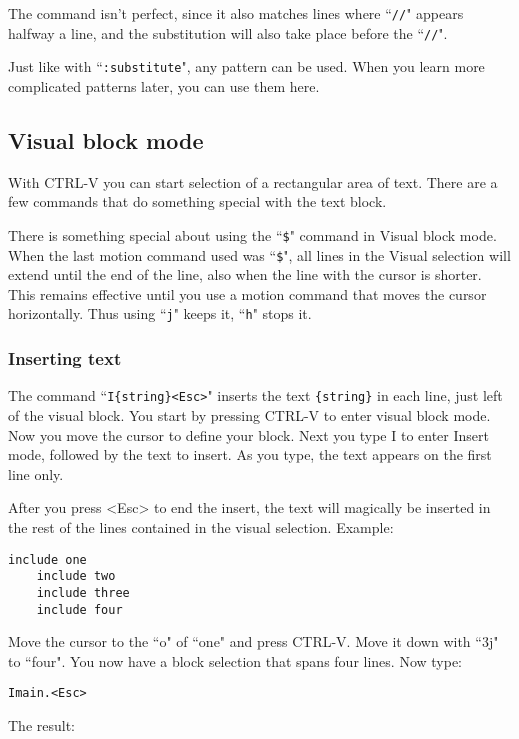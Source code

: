 The command isn't perfect, since it also matches lines where ``\texttt{//}" appears halfway a line, and the substitution will also take place before the ``\texttt{//}".

Just like with ``\texttt{:substitute}", any pattern can be used.
When you learn more complicated patterns later, you can use them here.
\subsection{Visual block mode}
With CTRL-V you can start selection of a rectangular area of text.
There are a few commands that do something special with the text block.

There is something special about using the ``\texttt{\$}" command in Visual block mode.
When the last motion command used was ``\texttt{\$}", all lines in the Visual selection will extend until the end of the line, also when the line with the cursor is shorter.
This remains effective until you use a motion command that moves the cursor horizontally.
Thus using ``\texttt{j}" keeps it, ``\texttt{h}" stops it.

\subsubsection{Inserting text}
The command  ``\texttt{I\{string\}<Esc>}" inserts the text \texttt{\{string\}} in each line, just left of the visual block.
You start by pressing CTRL-V to enter visual block mode.
Now you move the cursor to define your block.
Next you type I to enter Insert mode, followed by the text to insert.
As you type, the text appears on the first line only.

After you press <Esc> to end the insert, the text will magically be inserted in the rest of the lines contained in the visual selection.
Example:

\begin{Verbatim}[samepage=true]
    include one
    include two
    include three
    include four
\end{Verbatim}

Move the cursor to the ``o" of ``one" and press CTRL-V.
Move it down with ``3j" to ``four".
You now have a block selection that spans four lines.
Now type:

\begin{Verbatim}[samepage=true]
 Imain.<Esc>
\end{Verbatim}

The result:

